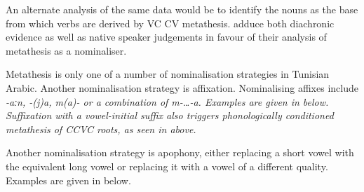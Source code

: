 An alternate analysis of the same data would be to identify the nouns as the base
from which verbs are derived by VC {\ra} CV metathesis.
\cite{kidr86} adduce both diachronic evidence
as well as native speaker judgements in favour of their
analysis of metathesis as a nominaliser.

Metathesis is only one of a number of nominalisation strategies in Tunisian Arabic.
Another nominalisation strategy is affixation.
Nominalising affixes include \it{-aːn}, \it{-(j)a},
\it{m(a)-} or a combination of \it{m-{\ldots}-a}.
Examples are given in  below.
Suffixation with a vowel-initial suffix
also triggers phonologically conditioned metathesis of CCVC roots,
as seen in  above.

\begin{exe}
	\label{ex:TunAraAff}
\end{exe}

Another nominalisation strategy is apophony,
either replacing a short vowel with the equivalent long vowel
or replacing it with a vowel of a different quality.
Examples are given in  below.

\begin{exe}
	\label{ex:TunAraApo}
\end{exe}

